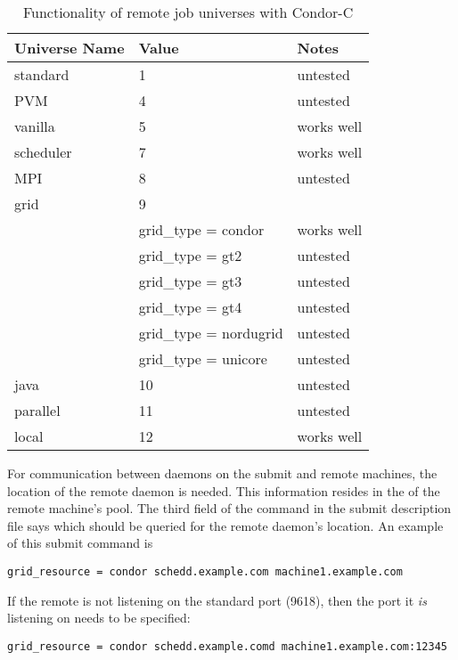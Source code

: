 \begin{center}
\begin{table}[hbt]
\begin{tabular}{|l|l|l}
\textbf{Universe Name} & \textbf{Value} & \textbf{Notes}\\ \hline \hline
standard  & 1 & untested \\ \hline
PVM       & 4 & untested \\ \hline
vanilla   & 5 & works well \\ \hline
scheduler & 7 & works well \\ \hline
MPI       & 8 & untested \\ \hline
grid      & 9 & \\
 & grid\_type = condor & works well \\
 & grid\_type = gt2  & untested \\
 & grid\_type = gt3 & untested \\
 & grid\_type = gt4 & untested \\ 
 & grid\_type = nordugrid & untested \\ 
 & grid\_type = unicore & untested \\ \hline
java & 10 & untested \\ \hline
parallel & 11 & untested \\ \hline
local & 12 & works well \\ \hline
\end{tabular}
\caption{\label{working-remote-universes}Functionality of remote job universes with Condor-C}
\end{table}
\end{center}

For communication between  daemons on the submit
and remote machines,
the location of the remote  daemon is needed.
This information resides in the  of the remote
machine's pool.
The third field of the  command in the submit description file
says which  should be queried for the remote 
daemon's location.
An example of this submit command is
\footnotesize
\begin{verbatim}
grid_resource = condor schedd.example.com machine1.example.com
\end{verbatim}
\normalsize
If the remote  is not listening on the standard port
(9618), then the port it \emph{is} listening on needs to be specified:
\footnotesize
\begin{verbatim}
grid_resource = condor schedd.example.comd machine1.example.com:12345
\end{verbatim}
\normalsize

